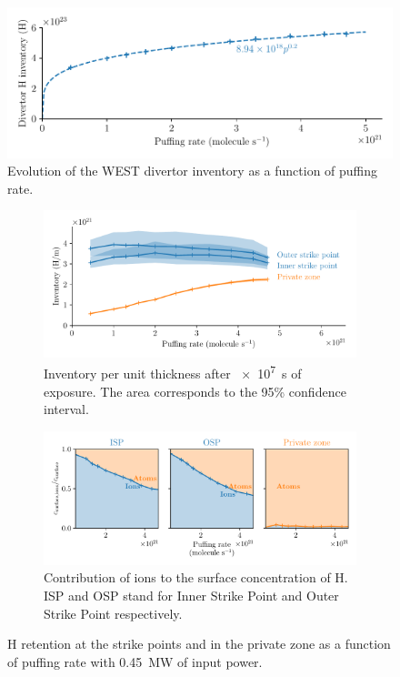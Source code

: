 \begin{figure}[h]
    \centering
    \includegraphics[width=\linewidth]{Figures/Chapter4/WEST/inventory_vs_puffing_rate.pdf}
    \caption{Evolution of the WEST divertor inventory as a function of puffing rate.}
\end{figure}

\begin{figure}[h!]
    \centering
    \begin{subfigure}{\linewidth}
        \includegraphics[width=\linewidth]{Figures/Chapter4/WEST/inventory_at_sp_and_private_zone.pdf}
        \caption{Inventory per unit thickness after \SI{e7}{s} of exposure. The area corresponds to the 95\% confidence interval.}
    \end{subfigure}
    \begin{subfigure}{\linewidth}
        \includegraphics[width=\linewidth]{Figures/Chapter4/WEST/ion_ratio_at_sp_and_private_zone.pdf}
        \caption{Contribution of ions to the surface concentration of H. ISP and OSP stand for Inner Strike Point and Outer Strike Point respectively.}
    \end{subfigure}%
    \caption{H retention at the strike points and in the private zone as a function of puffing rate with \SI{0.45}{MW} of input power.}
\end{figure}

